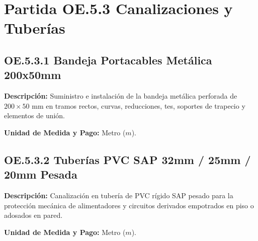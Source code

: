 \section{Partida OE.5.3 Canalizaciones y Tuberías}

\subsection{OE.5.3.1 Bandeja Portacables Metálica 200x50mm}
\textbf{Descripción:} Suministro e instalación de la bandeja metálica perforada de $200 \times 50\text{ mm}$ en tramos rectos, curvas, reducciones, tes, soportes de trapecio y elementos de unión.

\textbf{Unidad de Medida y Pago:} Metro ($m$).

\subsection{OE.5.3.2 Tuberías PVC SAP 32mm / 25mm / 20mm Pesada}
\textbf{Descripción:} Canalización en tubería de PVC rígido SAP pesado para la protección mecánica de alimentadores y circuitos derivados empotrados en piso o adosados en pared.

\textbf{Unidad de Medida y Pago:} Metro ($m$).
